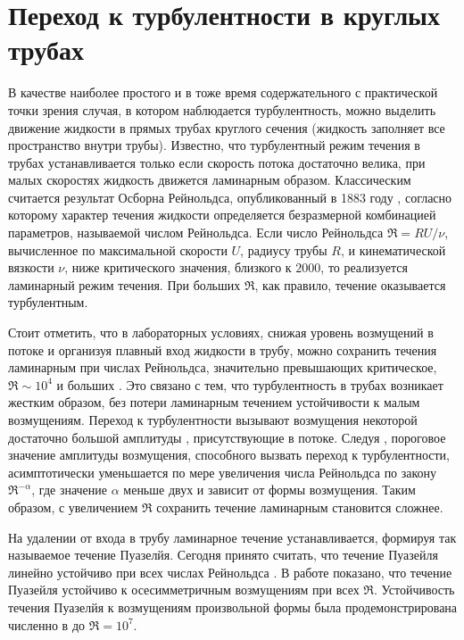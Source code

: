 \section{Переход к турбулентности в круглых трубах}

В качестве наиболее простого и в тоже время содержательного с практической точки зрения случая, в котором наблюдается турбулентность, можно выделить движение жидкости в прямых трубах круглого сечения (жидкость заполняет все пространство внутри трубы). Известно, что турбулентный режим течения в трубах устанавливается только если скорость потока достаточно велика, при малых скоростях жидкость движется ламинарным образом. Классическим считается результат Осборна Рейнольдса, опубликованный в 1883 году \cite{Reynolds1883}, согласно которому характер течения жидкости определяется безразмерной комбинацией параметров, называемой числом Рейнольдса. Если число Рейнольдса $\Re = RU/\nu$, вычисленное по максимальной скорости $U$, радиусу трубы $R$, и кинематической вязкости $\nu$, ниже критического значения, близкого к $2000$, то реализуется ламинарный режим течения. При больших $\Re$, как правило, течение оказывается турбулентным. 

Стоит отметить, что в лабораторных условиях, снижая уровень возмущений в потоке и организуя плавный вход жидкости в трубу, можно сохранить течения ламинарным при числах Рейнольдса, значительно превышающих критическое, $\Re \sim 10^4$ и больших \cite{Wygnanski1973, Darbyshire1995, vanDoorne2009}. Это связано с тем, что турбулентность в трубах возникает жестким образом, без потери ламинарным течением устойчивости к малым возмущениям. Переход к турбулентности вызывают возмущения некоторой достаточно большой амплитуды \cite{Grossmann2000}, присутствующие в потоке. Следуя \cite{Darbyshire1995, Hof2003, Peixinho2007, Mellibovsky2009critical}, пороговое значение амплитуды возмущения, способного вызвать переход к турбулентности, асимптотически уменьшается по мере увеличения числа Рейнольдса по закону $\Re^{-\alpha}$, где значение $\alpha$ меньше двух и зависит от формы возмущения. Таким образом, с увеличением $\Re$ сохранить течение ламинарным становится сложнее. 

На удалении от входа в трубу ламинарное течение устанавливается, формируя так называемое течение Пуазелйя. Сегодня принято считать, что течение Пуазейля линейно устойчиво при всех числах Рейнольдса \cite{Kerswell2005}. В работе \cite{Salwen1980} показано, что течение Пуазейля устойчиво к осесимметричным возмущениям при всех $\Re$. Устойчивость течения Пуазелйя к возмущениям произвольной формы была продемонстрирована численно в \cite{Meseguer2003} до $\Re = 10^7$. 

